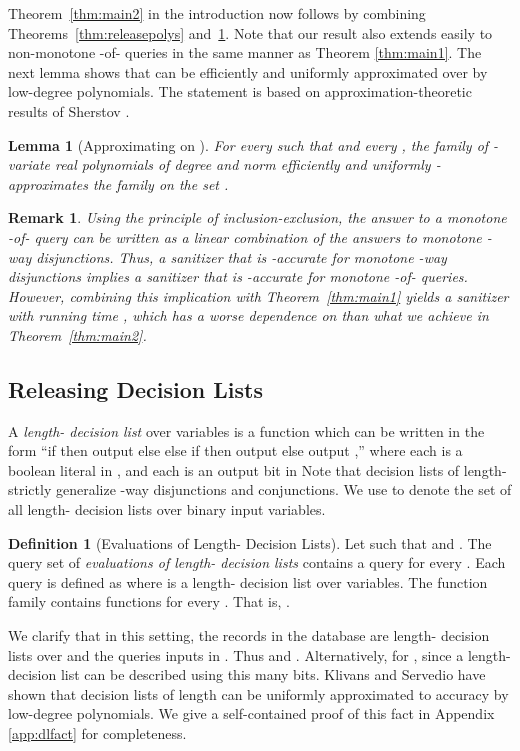 \documentclass[11pt]{article}
\newtheorem{lemma}[theorem]{Lemma}
\newtheorem{remark}[theorem]{Remark}
\theoremstyle{definition}
\newtheorem{definition}[theorem]{Definition}
\begin{document}
Theorem~\ref{thm:main2} in the introduction now follows by combining Theorems~\ref{thm:releasepolys} and~\ref{thm:approx2}. Note that our result also extends easily
to non-monotone -of- queries in the same manner as Theorem \ref{thm:main1}.  
\else
The next lemma shows that  can be efficiently and uniformly approximated over  by low-degree polynomials.  The statement is based on approximation-theoretic results of Sherstov \cite[Lemma 3.11]{Sherstov09}.
\begin{lemma}[Approximating  on ] \label{thm:approx2}
For every  such that  and every , the family  of -variate real polynomials of degree  and norm  efficiently and uniformly -approximates the family  on the set .
\end{lemma}
\fi

\begin{remark}
Using the principle of inclusion-exclusion, the answer to a monotone -of- query can be written as a linear combination of the answers to  monotone -way disjunctions. Thus, a sanitizer that is -accurate for monotone -way disjunctions implies a sanitizer that is -accurate for monotone -of- queries. However, combining this implication with Theorem~\ref{thm:main1} yields a sanitizer with running time , which has a worse dependence on  than what we achieve in Theorem~\ref{thm:main2}.
\end{remark}

\subsection{Releasing Decision Lists} \label{sec:dls}

A \emph{length- decision list} over  variables is a function which can be written in the form
``if  then output  else  else if 
then output  else output ,'' where each
 is a boolean literal in , and each  is an output
bit in  Note that decision lists of length- strictly generalize -way disjunctions and conjunctions.  We use  to denote the set of all length- decision lists over  binary input variables.

\begin{definition}[Evaluations of Length- Decision Lists] Let  such that  and .
The query set  of \emph{evaluations of length- decision lists} contains a query  for every .  Each query is defined as  where  is a length- decision list over  variables.
The  function family  contains functions  for every .  That is, .
\end{definition}


We clarify that in this setting, the records in the database are length- decision lists over  and the queries inputs in .  Thus  and .  Alternatively,  for , since a length- decision list can be described using this many bits.
\ifnum{}
Klivans and Servedio \cite[Claim 5.4]{KlivansSe04} have shown that decision lists of length  can be uniformly approximated to accuracy  by low-degree polynomials.  We give a self-contained proof of this fact in Appendix \ref{app:dlfact} for completeness.
\else
\fi
\end{document}
